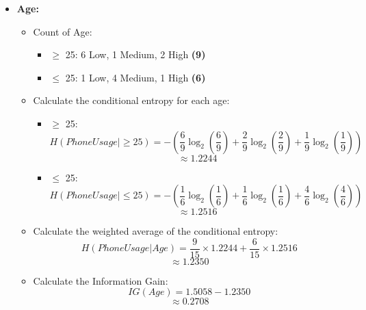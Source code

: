 \documentclass{article}
\begin{document}
\begin{enumerate}[label=\alph*)]
\begin{itemize}
\item \textbf{Age:}
\begin{itemize}
   \item Count of Age:
   \begin{itemize}
      \item \(\ge\) 25: 6 Low, 1 Medium, 2 High \textbf{(9)}
      \item \(\leq\) 25: 1 Low, 4 Medium, 1 High \textbf{(6)}
   \end{itemize}
   \item Calculate the conditional entropy for each age:
   \begin{itemize}
      \item \(\ge\) 25:
      \[
      H(Phone Usage | \ge 25) = -(\frac{6}{9} \log_2(\frac{6}{9}) + \frac{2}{9} \log_2(\frac{2}{9}) + \frac{1}{9} \log_2(\frac{1}{9}))
      \]
      \[
      \approx 1.2244
      \]
      \item \(\leq\) 25:
      \[
      H(Phone Usage | \leq 25) = -(\frac{1}{6} \log_2(\frac{1}{6}) + \frac{1}{6} \log_2(\frac{1}{6}) + \frac{4}{6} \log_2(\frac{4}{6}))
      \]
      \[
      \approx 1.2516
      \]
   \end{itemize}
   \item Calculate the weighted average of the conditional entropy:
   \[
   H(Phone Usage | Age) = \frac{9}{15} \times 1.2244 + \frac{6}{15} \times 1.2516
   \]
   \[
   \approx 1.2350
   \]
   \item Calculate the Information Gain:
   \[
   IG(Age) = 1.5058 - 1.2350
   \]
   \[
   \approx 0.2708
   \]
\end{itemize}


\end{itemize}
\end{enumerate}
\end{document}

